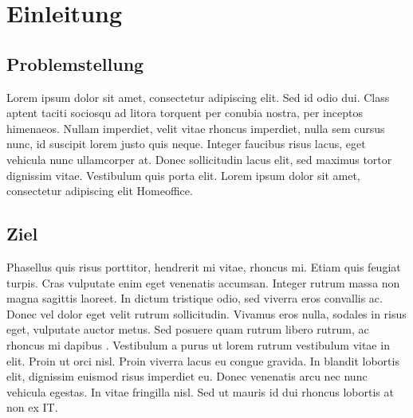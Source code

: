 \section{Einleitung}

\subsection{Problemstellung}
Lorem ipsum dolor sit amet, consectetur adipiscing elit. Sed id odio dui. Class aptent taciti sociosqu ad litora torquent per conubia nostra, per inceptos himenaeos. Nullam imperdiet, velit vitae rhoncus imperdiet, nulla sem cursus nunc, id suscipit lorem justo quis neque. Integer faucibus risus lacus, eget vehicula nunc ullamcorper at. Donec sollicitudin lacus elit, sed maximus tortor dignissim vitae. Vestibulum quis porta elit. Lorem ipsum dolor sit amet, consectetur adipiscing elit \gls{Homeoffice}.

\subsection{Ziel}
Phasellus quis risus porttitor, hendrerit mi vitae, rhoncus mi. Etiam quis feugiat turpis. Cras vulputate enim eget venenatis accumsan. Integer rutrum massa non magna sagittis laoreet. In dictum tristique odio, sed viverra eros convallis ac. Donec vel dolor eget velit rutrum sollicitudin. Vivamus eros nulla, sodales in risus eget, vulputate auctor metus. Sed posuere quam rutrum libero rutrum, ac rhoncus mi dapibus \autocite[vgl.][123]{boninVerbreitungUndAuswirkungen2020}. Vestibulum a purus ut lorem rutrum vestibulum vitae in elit. Proin ut orci nisl. Proin viverra lacus eu congue gravida. In blandit lobortis elit, dignissim euismod risus imperdiet eu. Donec venenatis arcu nec nunc vehicula egestas. In vitae fringilla nisl. Sed ut mauris id dui rhoncus lobortis at non ex \acrshort{IT}.
